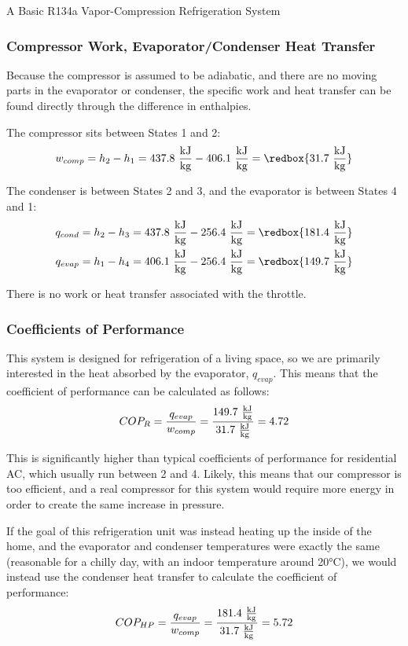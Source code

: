 \begin{example}[label=ex:ch4_refrigeration]{A Basic R134a Vapor-Compression Refrigeration System}
  \subsubsection*{Compressor Work, Evaporator/Condenser Heat Transfer}

  Because the compressor is assumed to be adiabatic, and there are no moving parts in the evaporator or condenser, the specific work and heat transfer can be found directly through the difference in enthalpies.

  The compressor sits between States 1 and 2:
  \begin{equation*}
    w_{comp} = h_2 - h_1 = 437.8\ \frac{\rm kJ}{\rm kg} - 406.1\ \frac{\rm kJ}{\rm kg} = \redbox{31.7\ \frac{\rm kJ}{\rm kg}}
  \end{equation*}

  The condenser is between States 2 and 3, and the evaporator is between States 4 and 1:
  \begin{align*}
    q_{cond} &= h_2 - h_3 = 437.8\ \frac{\rm kJ}{\rm kg} - 256.4\ \frac{\rm kJ}{\rm kg}= \redbox{181.4\ \frac{\rm kJ}{\rm kg}} \\
    q_{evap} &= h_1 - h_4 = 406.1\ \frac{\rm kJ}{\rm kg} - 256.4\ \frac{\rm kJ}{\rm kg}= \redbox{149.7\ \frac{\rm kJ}{\rm kg}}
  \end{align*}

  There is no work or heat transfer associated with the throttle.

  \subsubsection*{Coefficients of Performance}
  This system is designed for refrigeration of a living space, so we are primarily interested in the heat absorbed by the evaporator, $q_{evap}$.  This means that the coefficient of performance can be calculated as follows:
  \begin{equation*}
    COP_R = \frac{q_{evap}}{w_{comp}} = \frac{149.7\ \frac{\rm kJ}{\rm kg}}{31.7\ \frac{\rm kJ}{\rm kg}} = 4.72
  \end{equation*}

  This is significantly higher than typical coefficients of performance for residential AC, which usually run between 2 and 4.  Likely, this means that our compressor is too efficient, and a real compressor for this system would require more energy in order to create the same increase in pressure.

  If the goal of this refrigeration unit was instead heating up the inside of the home, and the evaporator and condenser temperatures were exactly the same (reasonable for a chilly day, with an indoor temperature around 20°C), we would instead use the condenser heat transfer to calculate the coefficient of performance:
  \begin{equation*}
    COP_{HP} = \frac{q_{evap}}{w_{comp}} = \frac{181.4\ \frac{\rm kJ}{\rm kg}}{31.7\ \frac{\rm kJ}{\rm kg}} = 5.72
  \end{equation*}


\end{example}
